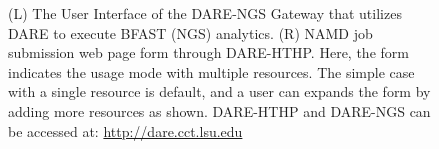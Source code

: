 \documentclass[]{svjour3}
\begin{document}
\begin{figure}
 \centering
  \caption{\small (L) The User Interface of the DARE-NGS Gateway that
    utilizes DARE to execute BFAST (NGS) analytics. (R) NAMD job
    submission web page form through DARE-HTHP. Here, the form
    indicates the usage mode with multiple resources. The simple case
    with a single resource is default, and a user can expands the form
    by adding more resources as shown. DARE-HTHP and DARE-NGS can be accessed at:
    \url{http://dare.cct.lsu.edu} }
  \label{fig:NAMD2}
\end{figure}
\end{document}

